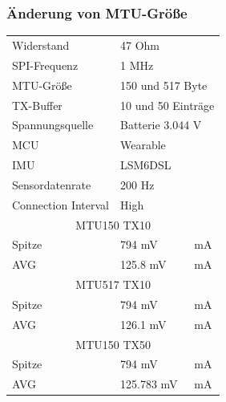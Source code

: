 \subsubsection{Änderung von MTU-Größe}
\begin{minipage}{\linewidth}
	\label{tab:aaaaaaaaaaaaaaaa}
	\begin{tabularx}{\linewidth}{|l|l|X|}
		Widerstand & \multicolumn{2}{l|}{47 Ohm}\\
    SPI-Frequenz & \multicolumn{2}{l|}{1 MHz}\\
    MTU-Größe & \multicolumn{2}{l|}{150 und 517 Byte}\\
    TX-Buffer & \multicolumn{2}{l|}{10 und 50 Einträge}\\
    Spannungsquelle & \multicolumn{2}{l|}{Batterie 3.044 V}\\
    MCU & \multicolumn{2}{l|}{Wearable}\\
    IMU & \multicolumn{2}{l|}{LSM6DSL}\\
    Sensordatenrate & \multicolumn{2}{l|}{200 Hz}\\
    Connection Interval & \multicolumn{2}{l|}{High}\\
    \hline
    \multicolumn{3}{|c|}{MTU150 TX10}\\
    Spitze & 794 mV & mA\\
    AVG & 125.8 mV & mA\\
    \hline
    \multicolumn{3}{|c|}{MTU517 TX10}\\
    Spitze & 794 mV & mA\\
    AVG & 126.1 mV & mA\\
    \hline
    \multicolumn{3}{|c|}{MTU150 TX50}\\
    Spitze & 794 mV & mA\\
    AVG & 125.783 mV & mA\\
  \end{tabularx}
\end{minipage}\\\\

